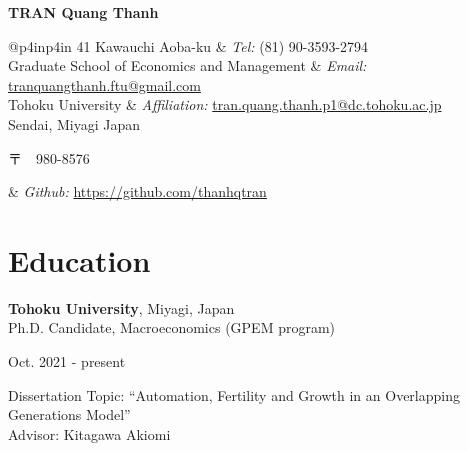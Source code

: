 \documentclass[a4paper,20pt]{article}
\newcommand\textjp[1]{%
	\begin{CJK}{UTF8}{min}#1\end{CJK}}
\begin{document}
	
	
	\begin{center}
		\textbf{{\LARGE \color{black} TRAN Quang Thanh}}
	\end{center}
	\vspace{2pt}
	
	\begin{tabular}{@{}p{4in}p{4in}}
		41 Kawauchi Aoba-ku                          & {\it Tel:}  (81) 90-3593-2794                                                                              \\            
		Graduate School of Economics and Management  & {\it Email:}  \href{mailto:tranquangthanh.ftu@gmail.com}{tranquangthanh.ftu@gmail.com}                     \\         
		Tohoku University                            & {\it Affiliation:}  \href{mailto:tran.quang.thanh.p1@dc.tohoku.ac.jp}{tran.quang.thanh.p1@dc.tohoku.ac.jp} \\       
		Sendai, Miyagi Japan \textjp{〒　980-8576} & {\it Github:} \href{https://github.com/thanhqtran}{https://github.com/thanhqtran}                          \\     
	\end{tabular}
	
	\vspace{4pt}
	
	
	\section{Education}
	\begin{minipage}{.7\linewidth} \begin{flushleft}
			\textbf{Tohoku University}, Miyagi, Japan \\
			\hspace{4mm} Ph.D. Candidate, Macroeconomics (GPEM program)
	\end{flushleft} \end{minipage}
	\hfill 
	\begin{minipage}{.25\linewidth}\begin{flushright}
			Oct. 2021 - present \\
			
	\end{flushright}\end{minipage}
	
	\vspace{2pt}
	\hspace{4mm} Dissertation Topic:  ``Automation, Fertility and Growth in an Overlapping Generations Model'' \\
	\hspace{4mm} Advisor:  Kitagawa Akiomi
	\vspace{2pt}
	
\end{document}
